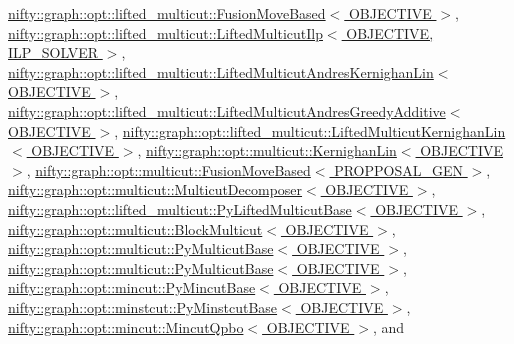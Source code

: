 \hyperlink{classnifty_1_1graph_1_1opt_1_1lifted__multicut_1_1FusionMoveBased_a648df4882bea393bd28adce4d0c2defa}{nifty\+::graph\+::opt\+::lifted\+\_\+multicut\+::\+Fusion\+Move\+Based$<$ O\+B\+J\+E\+C\+T\+I\+V\+E $>$}, \hyperlink{classnifty_1_1graph_1_1opt_1_1lifted__multicut_1_1LiftedMulticutIlp_aea508a0c1233c7e391e9dfbb16fee43e}{nifty\+::graph\+::opt\+::lifted\+\_\+multicut\+::\+Lifted\+Multicut\+Ilp$<$ O\+B\+J\+E\+C\+T\+I\+V\+E, I\+L\+P\+\_\+\+S\+O\+L\+V\+E\+R $>$}, \hyperlink{classnifty_1_1graph_1_1opt_1_1lifted__multicut_1_1LiftedMulticutAndresKernighanLin_a4ee4df60823384b6e1515a77f4ee2329}{nifty\+::graph\+::opt\+::lifted\+\_\+multicut\+::\+Lifted\+Multicut\+Andres\+Kernighan\+Lin$<$ O\+B\+J\+E\+C\+T\+I\+V\+E $>$}, \hyperlink{classnifty_1_1graph_1_1opt_1_1lifted__multicut_1_1LiftedMulticutAndresGreedyAdditive_a4ab9f84d8b762a10f8f31f5dc5721e70}{nifty\+::graph\+::opt\+::lifted\+\_\+multicut\+::\+Lifted\+Multicut\+Andres\+Greedy\+Additive$<$ O\+B\+J\+E\+C\+T\+I\+V\+E $>$}, \hyperlink{classnifty_1_1graph_1_1opt_1_1lifted__multicut_1_1LiftedMulticutKernighanLin_a682849d66dfe885424c729600754a160}{nifty\+::graph\+::opt\+::lifted\+\_\+multicut\+::\+Lifted\+Multicut\+Kernighan\+Lin$<$ O\+B\+J\+E\+C\+T\+I\+V\+E $>$}, \hyperlink{classnifty_1_1graph_1_1opt_1_1multicut_1_1KernighanLin_a0e6302dd8fad769a31a8cea2df10465f}{nifty\+::graph\+::opt\+::multicut\+::\+Kernighan\+Lin$<$ O\+B\+J\+E\+C\+T\+I\+V\+E $>$}, \hyperlink{classnifty_1_1graph_1_1opt_1_1multicut_1_1FusionMoveBased_af6dca89bd863d8c6f577a6cea0a18c98}{nifty\+::graph\+::opt\+::multicut\+::\+Fusion\+Move\+Based$<$ P\+R\+O\+P\+P\+O\+S\+A\+L\+\_\+\+G\+E\+N $>$}, \hyperlink{classnifty_1_1graph_1_1opt_1_1multicut_1_1MulticutDecomposer_aa079d79e3821334c45c26e5fdeb41c38}{nifty\+::graph\+::opt\+::multicut\+::\+Multicut\+Decomposer$<$ O\+B\+J\+E\+C\+T\+I\+V\+E $>$}, \hyperlink{classnifty_1_1graph_1_1opt_1_1lifted__multicut_1_1PyLiftedMulticutBase_aa9754f9f8128f36e7b5a76c6c6047036}{nifty\+::graph\+::opt\+::lifted\+\_\+multicut\+::\+Py\+Lifted\+Multicut\+Base$<$ O\+B\+J\+E\+C\+T\+I\+V\+E $>$}, \hyperlink{classnifty_1_1graph_1_1opt_1_1multicut_1_1BlockMulticut_aeac464d816f0b839bbbfcf9ab4238d06}{nifty\+::graph\+::opt\+::multicut\+::\+Block\+Multicut$<$ O\+B\+J\+E\+C\+T\+I\+V\+E $>$}, \hyperlink{classnifty_1_1graph_1_1opt_1_1multicut_1_1PyMulticutBase_a1542fd534762e4bc4c9415848e53e622}{nifty\+::graph\+::opt\+::multicut\+::\+Py\+Multicut\+Base$<$ O\+B\+J\+E\+C\+T\+I\+V\+E $>$}, \hyperlink{classnifty_1_1graph_1_1opt_1_1multicut_1_1PyMulticutBase_a1542fd534762e4bc4c9415848e53e622}{nifty\+::graph\+::opt\+::multicut\+::\+Py\+Multicut\+Base$<$ O\+B\+J\+E\+C\+T\+I\+V\+E $>$}, \hyperlink{classnifty_1_1graph_1_1opt_1_1mincut_1_1PyMincutBase_a0c9a8b12b5a09262a007ae964fb04b04}{nifty\+::graph\+::opt\+::mincut\+::\+Py\+Mincut\+Base$<$ O\+B\+J\+E\+C\+T\+I\+V\+E $>$}, \hyperlink{classnifty_1_1graph_1_1opt_1_1minstcut_1_1PyMinstcutBase_a2987a843afc3fd9f53333e4fbed08aad}{nifty\+::graph\+::opt\+::minstcut\+::\+Py\+Minstcut\+Base$<$ O\+B\+J\+E\+C\+T\+I\+V\+E $>$}, \hyperlink{classnifty_1_1graph_1_1opt_1_1mincut_1_1MincutQpbo_a4bcea4c5573610d9b656a06772d97353}{nifty\+::graph\+::opt\+::mincut\+::\+Mincut\+Qpbo$<$ O\+B\+J\+E\+C\+T\+I\+V\+E $>$}, and 